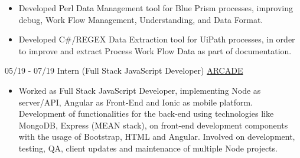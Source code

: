 \documentclass[letterpaper]{twentysecondcv} %
\begin{document}
\begin{twenty}
{\begin{itemize}
\begin{itemize}
                    \item Developed Perl Data Management tool for Blue Prism processes, improving debug, Work Flow Management, Understanding, and Data Format.
        
                    \item Developed C\#/REGEX Data Extraction tool for UiPath processes, in order to improve and extract Process Work Flow Data as part of documentation.
                    
                \end{itemize}
            \end{itemize}
        }

\end{twenty}

\newpage
\sidebar

\begin{twenty}
    \twentyitem
    	{05/19 - 07/19}
        {Intern (Full Stack JavaScript Developer)}
        { \href{https://arcader.life/}{ARCADE} }
        {
            \begin{itemize}
                \item Worked as Full Stack JavaScript Developer, implementing Node as server/API, Angular as Front-End and Ionic as mobile platform. Development of functionalities for the back-end using technologies like MongoDB, Express (MEAN stack), on front-end development components with the usage of Bootstrap, HTML and Angular. Involved on development, testing, QA, client updates and maintenance of multiple Node projects. 
            \end{itemize}
        }
        

\end{twenty}
\end{document}
